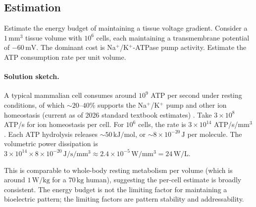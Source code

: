 \subsection*{Estimation}

\begin{exercise}
Estimate the energy budget of maintaining a tissue voltage gradient.
Consider a $1\,\text{mm}^3$ tissue volume with $10^6$ cells, each
maintaining a transmembrane potential of $-60\,\text{mV}$. The
dominant cost is Na$^+$/K$^+$-ATPase pump activity. Estimate the ATP
consumption rate per unit volume.

\paragraph{Solution sketch.}
A typical mammalian cell consumes around $10^9$ ATP per second under
resting conditions, of which $\sim 20$--$40\%$ supports the
Na$^+$/K$^+$ pump and other ion homeostasis (current as of 2026
standard textbook estimates) \cite{text:v6c13-alberts-mbc}. Take
$3\times 10^8$ ATP/s for ion homeostasis per cell. For $10^6$ cells,
the rate is $3\times 10^{14}$ ATP/s/$\text{mm}^3$. Each ATP
hydrolysis releases $\sim 50\,\text{kJ}/\text{mol}$, or $\sim
8\times 10^{-20}\,\text{J}$ per molecule. The volumetric power
dissipation is
$3\times 10^{14} \times 8\times 10^{-20}\,\text{J}/\text{s}/\text{mm}^3
\approx 2.4 \times 10^{-5}\,\text{W}/\text{mm}^3 = 24\,\text{W}/\text{L}$.

This is comparable to whole-body resting metabolism per volume
(which is around $1\,\text{W}/\text{kg}$ for a $70\,\text{kg}$ human),
suggesting the per-cell estimate is broadly consistent. The energy
budget is not the limiting factor for maintaining a bioelectric
pattern; the limiting factors are pattern stability and
addressability.
\end{exercise}

